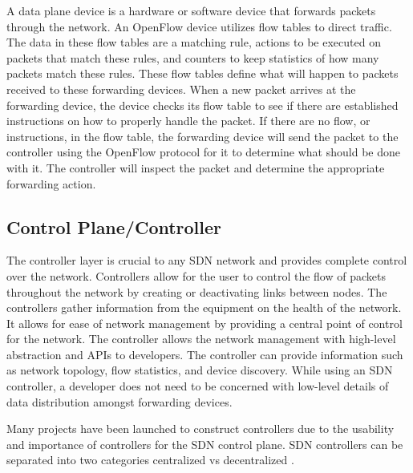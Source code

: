 \documentclass[conference]{IEEEtran}
\begin{document}
A data plane device is a hardware or software device that forwards packets through the network. An OpenFlow device utilizes flow tables to direct traffic. The data in these flow tables are a matching rule, actions to be executed on packets that match these rules, and counters to keep statistics of how many packets match these rules. These flow tables define what will happen to packets received to these forwarding devices. When a new packet arrives at the forwarding device, the device checks its flow table to see if there are established instructions on how to properly handle the packet. If there are no flow, or instructions, in the flow table, the forwarding device will send the packet to the controller using the OpenFlow protocol for it to determine what should be done with it. The controller will inspect the packet and determine the appropriate forwarding action.

\subsection{Control Plane/Controller}

The controller layer is crucial to any SDN network and provides complete control over the network. Controllers allow for the user to control the flow of packets throughout the network by creating or deactivating links between nodes. The controllers gather information from the equipment on the health of the network. 
It allows for ease of network management by providing a central point of control for the network. The controller allows the network management with high-level abstraction and APIs to developers. The controller can provide information such as network topology, flow statistics, and device discovery. While using an SDN controller, a developer does not need to be concerned with low-level details of data distribution amongst forwarding devices. 

Many projects have been launched to construct controllers due to the usability and importance of controllers for the SDN control plane. SDN controllers can be separated into two categories centralized vs decentralized \cite{kreutz2014software}\cite{ahmad2021scalability}.
\end{document}

